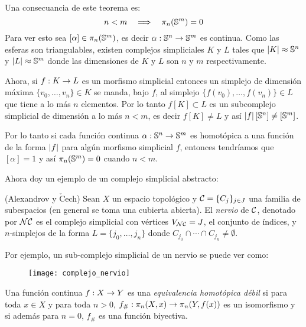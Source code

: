 \documentclass[../../topologia_algebraica]{subfiles}
\begin{document}
\begin{nota}
	Una consecuancia de este teorema es:
	\begin{equation}\label{eq:pi_n_de_Sm_es_cero}
		n < m \quad\Longrightarrow\quad \pi_n(\mathbb{S}^m)=0
	\end{equation}
	Para ver esto sea $[\alpha]\in\pi_n(\mathbb{S}^m)$, es decir $\alpha:\mathbb{S}^n\rightarrow\mathbb{S}^m$ es continua. Como
	las esferas son triangulables, existen complejos simpliciales $K$ y $L$ tales que $\left| K \right|\approx\mathbb{S}^n$
	y $\left| L \right|\approx\mathbb{S}^m$ donde las dimensiones de $K$ y $L$ son $n$ y $m$ respectivamente.

	Ahora, si $f:K\rightarrow L$ es un morfismo simplicial entonces un simplejo de dimensi\'on m\'axima
	$\{v_0,\ldots,v_n\}\in K$ se manda, bajo $f$, al simplejo $\{f(v_0),\ldots,f(v_n)\}\in L$ que tiene
	a lo m\'as $n$ elementos. Por lo tanto $f[K]\subset L$ es un subcomplejo simplicial de dimensi\'on
	a lo m\'as $n<m$, es decir $f[K]\neq L$ y as\'i $\left| f \right|[\mathbb{S}^n]\neq[\mathbb{S}^m]$.

	Por lo tanto si cada funci\'on continua $\alpha:\mathbb{S}^n\rightarrow\mathbb{S}^m$ es homot\'opica a una funci\'on
	de la forma $\left| f \right|$ para alg\'un morfismo simplicial $f$, entonces tendr\'iamos que $[\alpha]=1$
	y as\'i $\pi_n(\mathbb{S}^m)=0$ cuando $n<m$.
\end{nota}

Ahora doy un ejemplo de un complejo simplicial abstracto:

\begin{defin}(Alexandrov y $\check{\text{C}}$ech)
  Sean $X$ un espacio topol\'ogico y $\mathcal{C}=\{C_j\}_{j\in J}$ una familia de subespacios (en general
  se toma una cubierta abierta). El \emph{nervio} de $\mathcal{C}$, denotado por $\mathcal{N}\mathcal{C}$ es el complejo
  simplicial con v\'ertices $V_{\mathcal{N}\mathcal{C}}=J$, el conjunto de \'indices, y $n$-simplejos de la forma
  $L=\{j_0,\ldots,j_n\}$ donde $C_{j_0}\cap\cdots\cap C_{j_n}\neq\emptyset$.
\end{defin}

Por ejemplo, un sub-complejo simplicial de un nervio se puede ver como:

\begin{figure}[h!]%
  \centering
  \texttt{[image: complejo\_nervio]}
\end{figure}%

\begin{defin}
  Una funci\'on continua $f:X\rightarrow Y$ es una \emph{equivalencia homot\'opica d\'ebil} si para toda $x\in X$
  y para toda $n>0$, $f_{\#}:\pi_n(X,x)\rightarrow\pi_n(Y,f(x))$ es un isomorfismo y si adem\'as para $n=0$, $f_{\#}$
  es una funci\'on biyectiva.
\end{defin}
\end{document}
